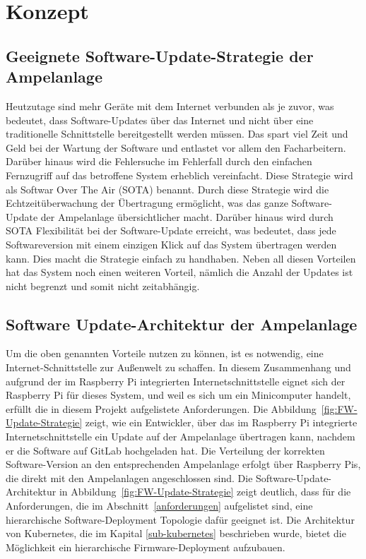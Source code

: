 \section{Konzept}


\subsection{Geeignete Software-Update-Strategie der Ampelanlage}

Heutzutage sind mehr Geräte mit dem Internet verbunden als je zuvor, was bedeutet, dass Software-Updates über das Internet und nicht über eine traditionelle Schnittstelle bereitgestellt werden müssen. Das spart viel Zeit und Geld bei der Wartung der Software und entlastet vor allem den Facharbeitern. Darüber hinaus wird die Fehlersuche im Fehlerfall durch den einfachen Fernzugriff auf das betroffene System erheblich vereinfacht. 
Diese Strategie wird als Softwar Over The Air (SOTA) benannt. Durch diese Strategie wird die Echtzeitüberwachung der Übertragung ermöglicht, was das ganze Software-Update der Ampelanlage übersichtlicher macht. Darüber hinaus wird durch SOTA Flexibilität bei der Software-Update erreicht, was bedeutet, dass jede Softwareversion mit einem einzigen Klick auf das System übertragen werden kann.
Dies macht die Strategie einfach zu handhaben. Neben all diesen Vorteilen hat das System noch einen weiteren Vorteil, nämlich die Anzahl der Updates ist nicht begrenzt und somit nicht zeitabhängig.


\subsection{Software Update-Architektur der Ampelanlage}

Um die oben genannten Vorteile nutzen zu können, ist es notwendig, eine Internet-Schnittstelle zur Außenwelt zu schaffen. In diesem Zusammenhang und aufgrund der im Raspberry Pi integrierten Internetschnittstelle eignet sich der Raspberry Pi für dieses System,  und weil es sich um ein Minicomputer handelt, erfüllt die in diesem Projekt aufgelistete Anforderungen. Die Abbildung~\ref{fig:FW-Update-Strategie} zeigt, wie ein Entwickler, über das im Raspberry Pi integrierte Internetschnittstelle ein Update auf der Ampelanlage übertragen kann, nachdem er die Software auf GitLab hochgeladen hat. Die Verteilung der korrekten Software-Version an den entsprechenden Ampelanlage erfolgt über Raspberry Pis, die direkt mit den Ampelanlagen angeschlossen sind.
\newline\newline
Die Software-Update-Architektur in Abbildung~\ref{fig:FW-Update-Strategie} zeigt deutlich, dass für die Anforderungen, die im Abschnitt~\ref{anforderungen} aufgelistet sind, eine hierarchische Software-Deployment Topologie dafür geeignet ist. 
\newline\newline
Die Architektur von Kubernetes, die im Kapital \ref{sub-kubernetes} beschrieben wurde, bietet die Möglichkeit ein hierarchische Firmware-Deployment aufzubauen.


